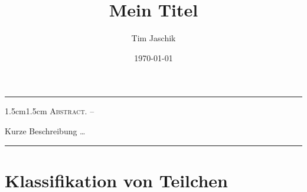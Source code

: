 \documentclass[10pt, letterpaper]{article}
\title{Mein Titel}
\author{Tim Jaschik}
\date{\today}
\renewenvironment{abstract}
  {
    \begin{adjustwidth}{1.5cm}{1.5cm}
    \small
    \textsc{Abstract. –}%
  }
  {
    \end{adjustwidth}
  }
\begin{document}
\maketitle
\rule{\textwidth}{0.5pt}
\begin{abstract}
Kurze Beschreibung …
\end{abstract}
\rule{\textwidth}{0.5pt}
\vspace{0.5cm}

\tableofcontents



\pagebreak


\section{Klassifikation von Teilchen}
\end{document}
